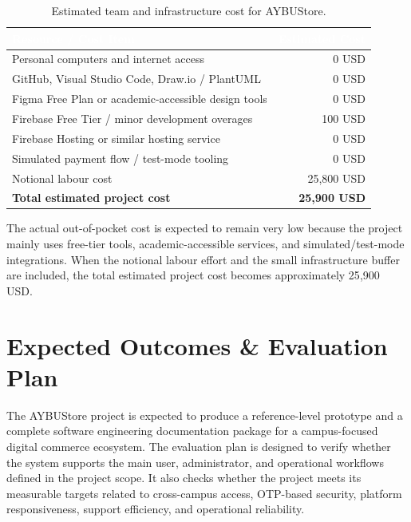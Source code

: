 \documentclass[11pt,a4paper]{article}
\begin{document}
\renewcommand{\arraystretch}{1.25}
\begin{table}[H]
\centering
\small
\begin{tabularx}{0.88\textwidth}{|X|r|}
\hline
\rowcolor{aybuHeader}
\textcolor{white}{\textbf{Resource / Cost Item}} &
\textcolor{white}{\textbf{Estimated Cost}} \\ \hline
 
Personal computers and internet access & 0 USD \\ \hline
GitHub, Visual Studio Code, Draw.io / PlantUML & 0 USD \\ \hline
Figma Free Plan or academic-accessible design tools & 0 USD \\ \hline
Firebase Free Tier / minor development overages & 100 USD \\ \hline
Firebase Hosting or similar hosting service & 0 USD \\ \hline
Simulated payment flow / test-mode tooling & 0 USD \\ \hline
Notional labour cost & 25{,}800 USD \\ \hline
\textbf{Total estimated project cost} & \textbf{25{,}900 USD} \\ \hline
 
\end{tabularx}
\caption{Estimated team and infrastructure cost for AYBUStore.}
\label{tab:team-resource-cost}
\end{table}
 
The actual out-of-pocket cost is expected to remain very low because the
project mainly uses free-tier tools, academic-accessible services, and
simulated/test-mode integrations. When the notional labour effort and the
small infrastructure buffer are included, the total estimated project cost
becomes approximately 25{,}900 USD.
 
 
\section{Expected Outcomes \& Evaluation Plan}
\label{sec:expected-outcomes-evaluation}
 
The AYBUStore project is expected to produce a reference-level
prototype and a complete software engineering documentation package
for a campus-focused digital commerce ecosystem. The evaluation plan
is designed to verify whether the system supports the main user,
administrator, and operational workflows defined in the project scope.
It also checks whether the project meets its measurable targets related
to cross-campus access, OTP-based security, platform responsiveness,
support efficiency, and operational reliability.
 
\end{document}
